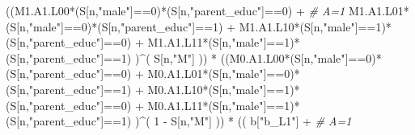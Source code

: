 \documentclass[
]{book}
\newenvironment{Shaded}{\begin{snugshade}}{\end{snugshade}}
\newcommand{\CommentTok}[1]{\textcolor[rgb]{0.56,0.35,0.01}{\textit{#1}}}
\newcommand{\DecValTok}[1]{\textcolor[rgb]{0.00,0.00,0.81}{#1}}
\newcommand{\NormalTok}[1]{#1}
\newcommand{\SpecialCharTok}[1]{\textcolor[rgb]{0.00,0.00,0.00}{#1}}
\newcommand{\StringTok}[1]{\textcolor[rgb]{0.31,0.60,0.02}{#1}}
\begin{document}
\begin{Shaded}
\begin{Highlighting}[]
\NormalTok{          ((M1.A1.L00}\SpecialCharTok{*}\NormalTok{(S[n,}\StringTok{"male"}\NormalTok{]}\SpecialCharTok{==}\DecValTok{0}\NormalTok{)}\SpecialCharTok{*}\NormalTok{(S[n,}\StringTok{"parent\_educ"}\NormalTok{]}\SpecialCharTok{==}\DecValTok{0}\NormalTok{) }\SpecialCharTok{+}                \CommentTok{\# A\textquotesingle{}=1}
\NormalTok{              M1.A1.L01}\SpecialCharTok{*}\NormalTok{(S[n,}\StringTok{"male"}\NormalTok{]}\SpecialCharTok{==}\DecValTok{0}\NormalTok{)}\SpecialCharTok{*}\NormalTok{(S[n,}\StringTok{"parent\_educ"}\NormalTok{]}\SpecialCharTok{==}\DecValTok{1}\NormalTok{) }\SpecialCharTok{+}
\NormalTok{              M1.A1.L10}\SpecialCharTok{*}\NormalTok{(S[n,}\StringTok{"male"}\NormalTok{]}\SpecialCharTok{==}\DecValTok{1}\NormalTok{)}\SpecialCharTok{*}\NormalTok{(S[n,}\StringTok{"parent\_educ"}\NormalTok{]}\SpecialCharTok{==}\DecValTok{0}\NormalTok{) }\SpecialCharTok{+} 
\NormalTok{              M1.A1.L11}\SpecialCharTok{*}\NormalTok{(S[n,}\StringTok{"male"}\NormalTok{]}\SpecialCharTok{==}\DecValTok{1}\NormalTok{)}\SpecialCharTok{*}\NormalTok{(S[n,}\StringTok{"parent\_educ"}\NormalTok{]}\SpecialCharTok{==}\DecValTok{1}\NormalTok{) )}\SpecialCharTok{\^{}}\NormalTok{( S[n,}\StringTok{"M"}\NormalTok{] )) }\SpecialCharTok{*}
\NormalTok{      ((M0.A1.L00}\SpecialCharTok{*}\NormalTok{(S[n,}\StringTok{"male"}\NormalTok{]}\SpecialCharTok{==}\DecValTok{0}\NormalTok{)}\SpecialCharTok{*}\NormalTok{(S[n,}\StringTok{"parent\_educ"}\NormalTok{]}\SpecialCharTok{==}\DecValTok{0}\NormalTok{) }\SpecialCharTok{+}                
\NormalTok{          M0.A1.L01}\SpecialCharTok{*}\NormalTok{(S[n,}\StringTok{"male"}\NormalTok{]}\SpecialCharTok{==}\DecValTok{0}\NormalTok{)}\SpecialCharTok{*}\NormalTok{(S[n,}\StringTok{"parent\_educ"}\NormalTok{]}\SpecialCharTok{==}\DecValTok{1}\NormalTok{) }\SpecialCharTok{+}
\NormalTok{          M0.A1.L10}\SpecialCharTok{*}\NormalTok{(S[n,}\StringTok{"male"}\NormalTok{]}\SpecialCharTok{==}\DecValTok{1}\NormalTok{)}\SpecialCharTok{*}\NormalTok{(S[n,}\StringTok{"parent\_educ"}\NormalTok{]}\SpecialCharTok{==}\DecValTok{0}\NormalTok{) }\SpecialCharTok{+} 
\NormalTok{          M0.A1.L11}\SpecialCharTok{*}\NormalTok{(S[n,}\StringTok{"male"}\NormalTok{]}\SpecialCharTok{==}\DecValTok{1}\NormalTok{)}\SpecialCharTok{*}\NormalTok{(S[n,}\StringTok{"parent\_educ"}\NormalTok{]}\SpecialCharTok{==}\DecValTok{1}\NormalTok{) )}\SpecialCharTok{\^{}}\NormalTok{( }\DecValTok{1} \SpecialCharTok{{-}}\NormalTok{ S[n,}\StringTok{"M"}\NormalTok{] )) }\SpecialCharTok{*}
\NormalTok{      (( b[}\StringTok{"b\_L1"}\NormalTok{] }\SpecialCharTok{+}                                                            \CommentTok{\# A=1}

\end{Highlighting}
\end{Shaded}
\end{document}
